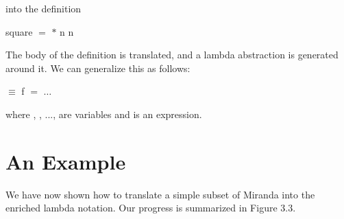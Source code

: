 \noindent into the  definition
\begin{mlcoded}
    square $=$ $*$ n n
\end{mlcoded}

The body of the definition is translated, and a lambda abstraction is generated around it. We can generalize this as follows:
\begin{mlcoded}
     $\equiv$ f $=$ $\ldots$
\end{mlcoded}
where , , ...,  are variables and  is an expression.

\section{An Example}
We have now shown how to translate a simple subset of Miranda into the enriched lambda notation. Our progress is summarized in Figure 3.3.


